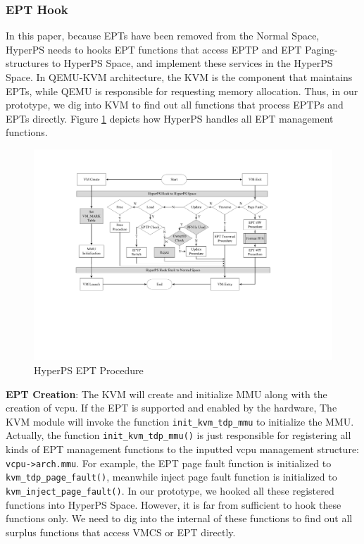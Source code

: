 \subsubsection{EPT Hook}%
\label{ssub:ept_hook}


In this paper, because EPTs have been removed from the Normal Space, 
HyperPS needs to hooks EPT functions that access EPTP and EPT Paging-structures to HyperPS Space, and implement these services in the HyperPS Space.
In QEMU-KVM architecture, the KVM is the component that maintains EPTs, while QEMU is responsible for requesting memory allocation.
Thus, in our prototype, we dig into KVM to find out all functions that process EPTPs and EPTs directly. Figure \ref{fig:impept} depicts how HyperPS handles all EPT management functions. 

\begin{figure}[htpb]
    \centering
    \includegraphics[width=1\linewidth]{./IMG/imp-ept-handle.pdf}
    \caption{HyperPS EPT Procedure}%
    \label{fig:impept}
\end{figure}

\textbf{EPT Creation}: The KVM will create and initialize MMU along with the creation of vcpu. 
If the EPT is supported and enabled by the hardware, The KVM module will invoke the function \verb|init_kvm_tdp_mmu| to initialize the MMU. 
Actually, the function \verb|init_kvm_tdp_mmu()| is just responsible for registering all kinds of EPT management functions to the inputted vcpu management structure: \verb|vcpu->arch.mmu|. 
For example, the EPT page fault function is initialized to \verb|kvm_tdp_page_fault()|, meanwhile inject page fault function is initialized to \verb|kvm_inject_page_fault()|. 
In our prototype, we hooked all these registered functions into HyperPS Space. However, it is far from sufficient to hook these functions only. We need to dig into the internal of these functions to find out all surplus functions that access VMCS or EPT directly.

